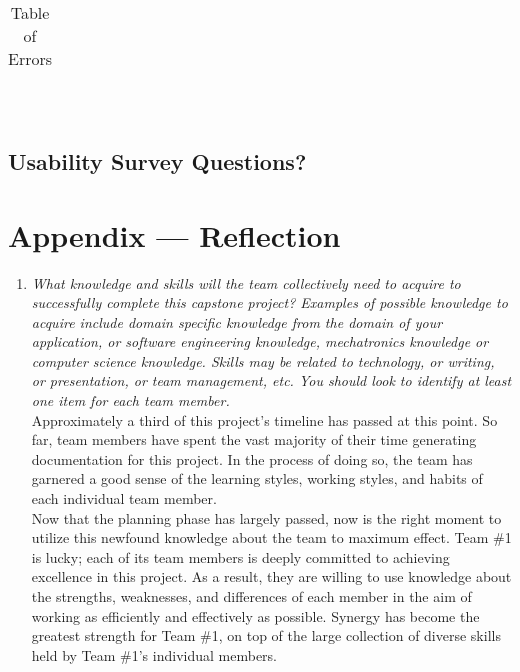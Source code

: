 \documentclass[12pt, titlepage]{article}
\begin{document}
\begin{enumerate}
\begin{flushleft}
\begin{table}[H]
\begin{tabular}{l l}
			  \bottomrule
		\end{tabular}\\
		\caption{\label{Err}Table of Errors}

	\end{table}
\end{flushleft} 
\subsection{Usability Survey Questions?}



\newpage{}
\section*{Appendix --- Reflection}

\begin{enumerate}
  \item \textit{What knowledge and skills will the team collectively need to acquire to
          successfully complete this capstone project?  Examples of possible knowledge
          to acquire include domain specific knowledge from the domain of your
          application, or software engineering knowledge, mechatronics knowledge or
          computer science knowledge.  Skills may be related to technology, or writing,
          or presentation, or team management, etc.  You should look to identify at
          least one item for each team member.}\\

        Approximately a third of this project's timeline has passed at this point. So far, team members have spent the vast majority of their time generating documentation for this project. In the process of doing so, the team has garnered a good sense of the learning styles, working styles, and habits of each individual team member.\\

        Now that the planning phase has largely passed, now is the right moment to utilize this newfound knowledge about the team to maximum effect. Team \#1 is lucky; each of its team members is deeply committed to achieving excellence in this project. As a result, they are willing to use knowledge about the strengths, weaknesses, and differences of each member in the aim of working as efficiently and effectively as possible. Synergy has become the greatest strength for Team \#1, on top of the large collection of diverse skills held by Team \#1's individual members.\\


\end{enumerate}
\end{enumerate}
\end{document}
